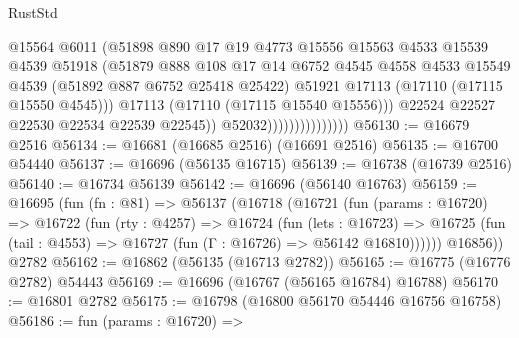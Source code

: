 \begin{lexlean}{RustStd}
\begin{coremodule}
                                      @15564
                                      @6011
                                      (@51898
                                        @890
                                        @17
                                        @19
                                        @4773
                                        @15556
                                        @15563
                                        @4533
                                        @15539
                                        @4539
                                        @51918
                                        (@51879
                                          @888
                                          @108
                                          @17
                                          @14
                                          @6752
                                          @4545
                                          @4558
                                          @4533
                                          @15549
                                          @4539
                                          (@51892 @887 @6752 @25418 @25422)
                                          @51921
                                          @17113
                                          (@17110 (@17115 @15550 @4545)))
                                        @17113
                                        (@17110 (@17115 @15540 @15556)))
                                      @22524
                                      @22527
                                      @22530
                                      @22534
                                      @22539
                                      @22545))
                                  @52032)))))))))))))))
@56130 := @16679 @2516
@56134 := @16681 (@16685 @2516) (@16691 @2516)
@56135 := @16700 @54440
@56137 := @16696 (@56135 @16715)
@56139 := @16738 (@16739 @2516)
@56140 := @16734 @56139
@56142 := @16696 (@56140 @16763)
@56159 := @16695
    (fun (fn : @81) =>
    @56137
      (@16718
        (@16721
          (fun (params : @16720) =>
          @16722
            (fun (rty : @4257) =>
            @16724
              (fun (lets : @16723) =>
              @16725 (fun (tail : @4553) => @16727 (fun (Γ : @16726) => @56142 @16810))))))
        @16856))
    @2782
@56162 := @16862 (@56135 (@16713 @2782))
@56165 := @16775 (@16776 @2782) @54443
@56169 := @16696 (@16767 (@56165 @16784) @16788)
@56170 := @16801 @2782
@56175 := @16798 (@16800 @56170 @54446 @16756 @16758)
@56186 := fun (params : @16720) =>

\end{coremodule}
\end{lexlean}
